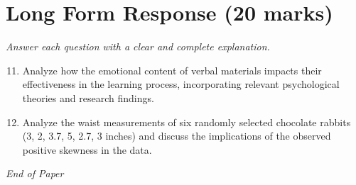 \documentclass[12pt]{article}
\begin{document}
\section*{Long Form Response (20 marks)}
\textit{Answer each question with a clear and complete explanation.}
\begin{enumerate}[label=\arabic*.]
\setcounter{enumi}{10}
\item Analyze how the emotional content of verbal materials impacts their effectiveness in the learning process, incorporating relevant psychological theories and research findings.
\item Analyze the waist measurements of six randomly selected chocolate rabbits (3, 2, 3.7, 5, 2.7, 3 inches) and discuss the implications of the observed positive skewness in the data.
\end{enumerate}

\vfill
\noindent\textit{End of Paper}
\end{document}
